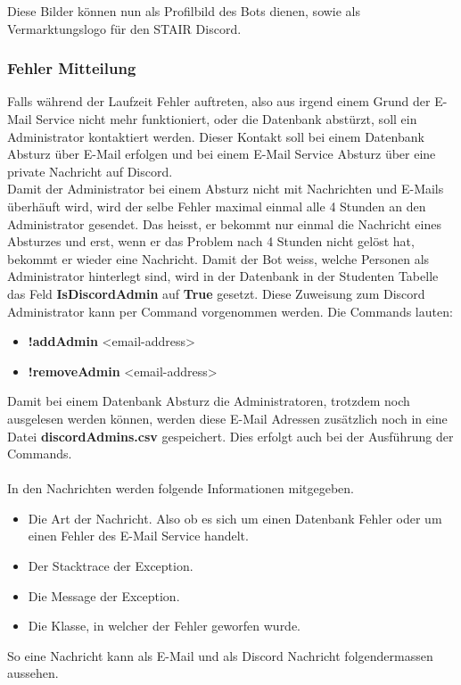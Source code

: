 \documentclass[a4paper, table]{article}
\begin{document}
Diese Bilder können nun als Profilbild des Bots dienen, sowie als Vermarktungslogo für den STAIR Discord.

\subsubsection{Fehler Mitteilung}
Falls während der Laufzeit Fehler auftreten, also aus irgend einem Grund der E-Mail Service nicht mehr funktioniert, 
oder die Datenbank abstürzt, soll ein Administrator kontaktiert werden.
Dieser Kontakt soll bei einem Datenbank Absturz über E-Mail erfolgen und bei einem E-Mail Service Absturz über eine private Nachricht auf Discord.\\
Damit der Administrator bei einem Absturz nicht mit Nachrichten und E-Mails überhäuft wird, 
wird der selbe Fehler maximal einmal alle 4 Stunden an den Administrator gesendet.
Das heisst, er bekommt nur einmal die Nachricht eines Absturzes und erst, wenn er das Problem nach 4 Stunden nicht gelöst hat, 
bekommt er wieder eine Nachricht.
\newpage
Damit der Bot weiss, welche Personen als Administrator hinterlegt sind, 
wird in der Datenbank in der Studenten Tabelle das Feld \textbf{IsDiscordAdmin} auf \textbf{True} gesetzt.
Diese Zuweisung zum Discord Administrator kann per Command vorgenommen werden.
Die Commands lauten:
\begin{itemize}
    \item \textbf{!addAdmin} <email-address>
    \item \textbf{!removeAdmin} <email-address>
\end{itemize}
Damit bei einem Datenbank Absturz die Administratoren, trotzdem noch ausgelesen werden können, 
werden diese E-Mail Adressen zusätzlich noch in eine Datei \textbf{discordAdmins.csv} gespeichert.
Dies erfolgt auch bei der Ausführung der Commands.\\\\
In den Nachrichten werden folgende Informationen mitgegeben.
\begin{itemize}
    \item Die Art der Nachricht. Also ob es sich um einen Datenbank Fehler oder um einen Fehler des E-Mail Service handelt.
    \item Der Stacktrace der Exception.
    \item Die Message der Exception.
    \item Die Klasse, in welcher der Fehler geworfen wurde.
\end{itemize}
So eine Nachricht kann als E-Mail und als Discord Nachricht folgendermassen aussehen.
\end{document}
